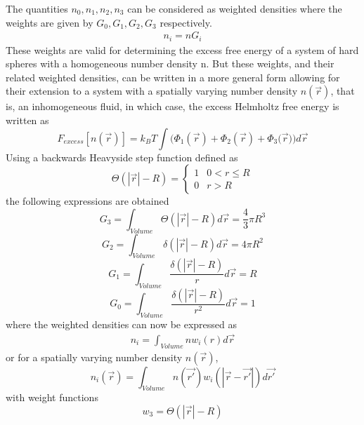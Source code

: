 \documentclass[double,12pt]{beavtex}
\begin{document}
The quantities $n_{0},n_{1},n_{2},n_{3}$ can be considered as weighted 
densities where the weights are given by $G_{0},G_{1},G_{2},G_{3}$ respectively.
\begin{align}
    n_{i}=nG_{i}
\end{align}
These weights are valid for determining the excess free energy of a system of 
hard spheres with a homogeneous number density n. But these weights, and 
their related  weighted densities, can be written in a more general form 
allowing for their extension to a system with a spatially varying number 
density $n(\vec{r})$, that is, an inhomogeneous fluid, in which case, the
excess Helmholtz free energy is written as
\begin{equation}\label{eq:F_ex-n-of-r}{F_{excess}[n(\vec{r})]= k_BT\int(\Phi_1(\vec{r})+\Phi_2(\vec{r})+\Phi_3(\vec{r}{)) d}\vec{r}}\end{equation} 
Using a backwards Heavyside step function defined as
\begin{equation}{\Theta(|\vec{r}|-R)=\left\{ \begin{array}{rc} 1 & 0<r \leq R \\ 0  & r>R \end{array}\right.}\end{equation}
the following expressions are obtained
\begin{equation}{G_{3}=\int_{Volume}{\Theta(|\vec{r}|-R)d{\vec{r}}} = \frac{4}{3}\pi{R^3}}\end{equation}
\begin{equation}{G_{2}=\int_{Volume}{\delta(|\vec{r}|-R)d{\vec{r}}} = 4\pi{R^2}}\end{equation}
\begin{equation}{G_{1}=\int_{Volume}{\frac{\delta(|\vec{r}|-R)}{r}d{\vec{r}}} = R}\end{equation}
\begin{equation}{G_{0}=\int_{Volume}{\frac{\delta(|\vec{r}|-R)}{r^2}d{\vec{r}}} = 1}\end{equation}
where the weighted densities can now be expressed as
\begin{align}
    n_{i}=\int_{Volume}{nw_{i}(r)}d{\vec{r}}
\end{align} 
or for a spatially varying number density $n(\vec{r})$,
\begin{equation}{n_i(\vec{r})=\int_{Volume}{n(\vec{r'})w_i(|\vec{r}-\vec{r'}|)d{\vec{r'}}}}\end{equation}
with weight functions
\begin{equation}\label{eq:w3}{w_{3}=\Theta(|\vec{r}|-R)}\end{equation}
\end{document}
